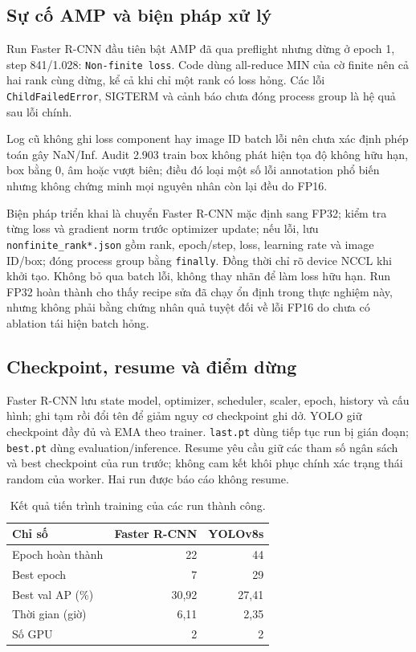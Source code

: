 \documentclass[a4paper,10pt,twocolumn]{article}
\newcommand{\FR}{Faster R-CNN}
\begin{document}
\subsection{Sự cố AMP và biện pháp xử lý}
Run \FR{} đầu tiên bật AMP đã qua preflight nhưng dừng ở epoch 1, step 841/1.028:
\texttt{Non-finite loss}. Code dùng all-reduce MIN của cờ finite nên cả hai rank
cùng dừng, kể cả khi chỉ một rank có loss hỏng. Các lỗi \texttt{ChildFailedError},
SIGTERM và cảnh báo chưa đóng process group là hệ quả sau lỗi chính.

Log cũ không ghi loss component hay image ID batch lỗi nên chưa xác định phép toán
gây NaN/Inf. Audit 2.903 train box không phát hiện tọa độ không hữu hạn, box bằng 0,
âm hoặc vượt biên; điều đó loại một số lỗi annotation phổ biến nhưng không chứng minh
mọi nguyên nhân còn lại đều do FP16.

Biện pháp triển khai là chuyển \FR{} mặc định sang FP32; kiểm tra từng loss và
gradient norm trước optimizer update; nếu lỗi, lưu \texttt{nonfinite\_rank*.json}
gồm rank, epoch/step, loss, learning rate và image ID/box; đóng process group bằng
\texttt{finally}. Đồng thời chỉ rõ device NCCL khi khởi tạo. Không bỏ qua batch lỗi,
không thay nhãn để làm loss hữu hạn. Run FP32 hoàn thành cho thấy recipe sửa đã chạy
ổn định trong thực nghiệm này, nhưng không phải bằng chứng nhân quả tuyệt đối về lỗi
FP16 do chưa có ablation tái hiện batch hỏng.

\subsection{Checkpoint, resume và điểm dừng}
\FR{} lưu state model, optimizer, scheduler, scaler, epoch, history và cấu hình;
ghi tạm rồi đổi tên để giảm nguy cơ checkpoint ghi dở. YOLO giữ checkpoint đầy đủ
và EMA theo trainer. \texttt{last.pt} dùng tiếp tục run bị gián đoạn;
\texttt{best.pt} dùng evaluation/inference. Resume yêu cầu giữ các tham số ngân sách
và best checkpoint của run trước; không cam kết khôi phục chính xác trạng thái random
của worker. Hai run được báo cáo không resume.

\begin{table}[t]
\centering\small
\caption{Kết quả tiến trình training của các run thành công.}
\label{tab:train}
\begin{tabular}{lrr}
\toprule
Chỉ số & Faster R-CNN & YOLOv8s \\
\midrule
Epoch hoàn thành & 22 & 44 \\
Best epoch & 7 & 29 \\
Best val AP (\%) & 30,92 & 27,41 \\
Thời gian (giờ) & 6,11 & 2,35 \\
Số GPU & 2 & 2 \\
\bottomrule
\end{tabular}
\end{table}
\end{document}
